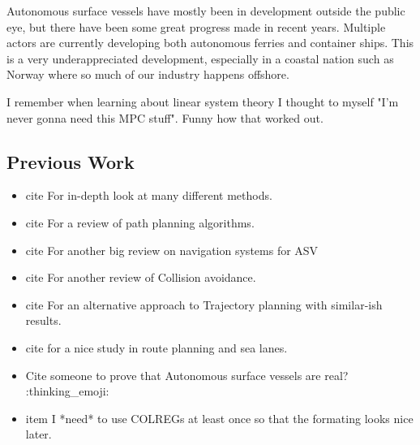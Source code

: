 Autonomous surface vessels have mostly been in development outside the public eye, but there have been some great progress made in recent years. 
Multiple actors are currently developing both autonomous ferries and container ships. This is a very underappreciated development, especially
in a coastal nation such as Norway where so much of our industry happens offshore.




I remember when learning about linear system theory I thought to myself "I'm never gonna need this MPC stuff". Funny how that worked out.

\subsection{Previous Work}
\begin{itemize}
    \item cite \cite{loe2007collision} For in-depth look at many different methods.
    \item cite \cite{vagale2021path} For a review of path planning algorithms.
    \item cite \cite{zhang2021collision} For another big review on navigation systems for ASV
    \item cite \cite{huang2020ship} For another review of Collision avoidance.
    \item cite \cite{park2020social} For an alternative approach to Trajectory planning with similar-ish results.
    \item cite \cite{vestad2019automatic} for a nice study in route planning and sea lanes.
    \item Cite someone to prove that Autonomous surface vessels are real? :thinking\_emoji:
    \item item I *need* to use \gls{COLREGs} at least once so that the formating looks nice later.
\end{itemize}

